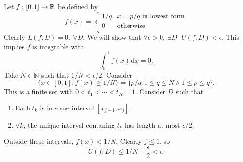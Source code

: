 \begin{example}
    Let $ f:[0,1]\to {\mathbb{R}} $ be defined by 
    \[
        f(x) = \begin{cases}
        1/q & x = p/q \text{ in lowest form}\\
        0 &\text{otherwise}\\
        \end{cases} 
    \]
    Clearly $ L(f,D)=0,\ \forall D $. We will show that $ \forall \epsilon>0,\ \exists D,\ U(f,D)<\epsilon $. This implies $f$ is integrable with 
    \[
        \int_{0}^{1} f(x) \,\mathrm{d}x=0.
    \]
    Take $ N\in \mathbb{N} $ such that $ 1/N<\epsilon/2 $. Consider 
    \[
        \{x\in [0,1]: f(x)\ge 1/N\} = \{p/q:1\le q\le N \land 1\le p\le q\}.
    \]
    This is a finite set with $ 0<t_1<\cdots<t_R=1 $. Consider $D$ such that 
    \begin{enumerate}
        \item Each $ t_k $ is in some interval $ [x_{j-1},x_j] $.
        \item $ \forall k $, the unique interval contaning $t_k$ has length at most $ \epsilon/2. $
    \end{enumerate}
    \begin{center}
    \end{center}
    Outside these intervals, $ f(x)<1/N $. Clearly $ f\le 1 $, so
    \[
        U(f,D)\le 1/N+\frac{\epsilon}{2}<\epsilon.
    \]
\end{example}

